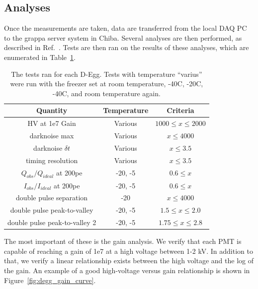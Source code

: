 \documentclass[main.tex]{subfiles}
\begin{document}
\subsection{Analyses}

Once the measurements are taken, data are transferred from the local DAQ PC to the grappa server system in Chiba. Several analyses are then performed, as described in Ref.~\cite{degg}. 
Tests are then ran on the results of these analyses, which are enumerated in Table~\ref{table:degg_tests}. 

\begin{table}
    \centering
    \begin{tabular}{c|cc}\rowcolor{blue!25}
        Quantity & Temperature & Criteria\\\hline
        HV at 1e7 Gain & Various & $1000\leq x \leq 2000$ \\
        darknoise max & Various & $x \leq 4000$ \\
        darknoise $\delta t$ & Various & $x \leq 3.5$ \\        
        timing resolution & Various & $x \leq 3.5$ \\
        $Q_{obs}/Q_{ideal}$ at 200pe & -20, -5 & $0.6\leq x$ \\
        $I_{obs}/I_{ideal}$ at 200pe & -20, -5 & $0.6\leq x$ \\
        double pulse separation & -20 & $x \leq 4000$ \\
        double pulse peak-to-valley & -20, -5 & $1.5\leq x\leq 2.0$ \\
        double pulse peak-to-valley 2 & -20, -5 & $1.75\leq x\leq 2.8$ \\
    \end{tabular}
    \caption{The tests ran for each D-Egg. Tests with temperature ``varius'' were run with the freezer set at room temperature, -40C, -20C, -40C, and room temperature again. }\label{table:degg_tests}
\end{table}

The most important of these is the gain analysis. 
We verify that each PMT is capable of reaching a gain of 1e7 at a high voltage between 1-2 kV. 
In addition to that, we verify a linear relationship exists between the high voltage and the log of the gain. 
An example of a good high-voltage versus gain relationship is shown in Figure~\ref{fig:degg_gain_curve}.
\end{document}
